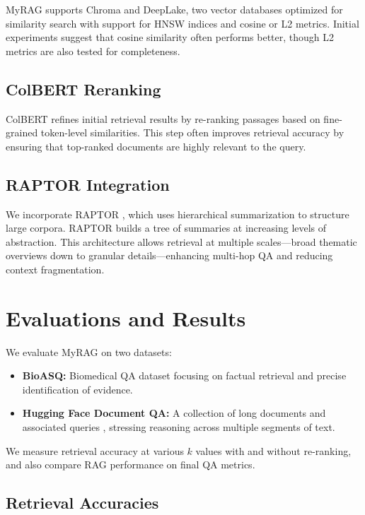 \documentclass{scrartcl}
\begin{document}
MyRAG supports Chroma and DeepLake, two vector databases optimized for similarity search with support for HNSW indices and cosine or L2 metrics. Initial experiments suggest that cosine similarity often performs better, though L2 metrics are also tested for completeness.

\subsection{ColBERT Reranking}

ColBERT \cite{khattab2020colbert} refines initial retrieval results by re-ranking passages based on fine-grained token-level similarities. This step often improves retrieval accuracy by ensuring that top-ranked documents are highly relevant to the query.

\subsection{RAPTOR Integration}

We incorporate RAPTOR \cite{wu2021recursively, raptor2024}, which uses hierarchical summarization to structure large corpora. RAPTOR builds a tree of summaries at increasing levels of abstraction. This architecture allows retrieval at multiple scales—broad thematic overviews down to granular details—enhancing multi-hop QA and reducing context fragmentation.

\section{Evaluations and Results}

We evaluate MyRAG on two datasets:
\begin{itemize}
    \item \textbf{BioASQ:} Biomedical QA dataset \cite{bioasq2023} focusing on factual retrieval and precise identification of evidence.
    \item \textbf{Hugging Face Document QA:} A collection of long documents and associated queries \cite{huggingface2024docqa}, stressing reasoning across multiple segments of text.
\end{itemize}

We measure retrieval accuracy at various $k$ values with and without re-ranking, and also compare RAG performance on final QA metrics.

\subsection{Retrieval Accuracies}
\end{document}
